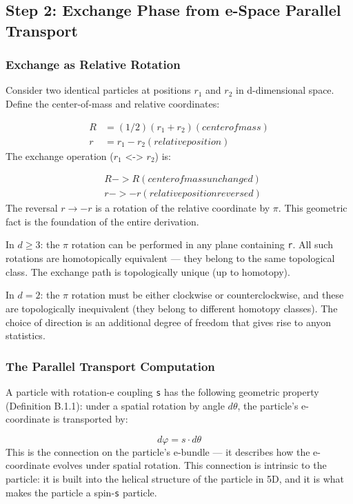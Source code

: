 \documentclass[aps,prd,preprint,superscriptaddress,longbibliography,floatfix]{revtex4-2}
\theoremstyle{remark}
\begin{document}
\subsection{Step 2: Exchange Phase from e-Space Parallel Transport}


\subsubsection{Exchange as Relative Rotation}

Consider two identical particles at positions $r_1$ and $r_2$ in d-dimensional space. Define the center-of-mass and relative coordinates:


\begin{align}
    R &= (1/2)(r_1 + r_2)      (center of mass) \\
    r &= r_1 - r_2              (relative position)
\end{align}
The exchange operation ($r_1$ <-> $r_2$) is:


\begin{align}
    & R -> R      (center of mass unchanged) \\
    & r -> -r     (relative position reversed)
\end{align}
The reversal $r \to -r$ is a rotation of the relative coordinate by $\pi$. This geometric fact is the foundation of the entire derivation.

In $d \geq 3$: the $\pi$ rotation can be performed in any plane containing \texttt{r}. All such rotations are homotopically equivalent --- they belong to the same topological class. The exchange path is topologically unique (up to homotopy).

In $d = 2$: the $\pi$ rotation must be either clockwise or counterclockwise, and these are topologically inequivalent (they belong to different homotopy classes). The choice of direction is an additional degree of freedom that gives rise to anyon statistics.


\subsubsection{The Parallel Transport Computation}

A particle with rotation-e coupling \texttt{s} has the following geometric property (Definition B.1.1): under a spatial rotation by angle $d\theta$, the particle's e-coordinate is transported by:


\begin{equation}
    d\varphi = s \cdot d\theta
\end{equation}
This is the connection on the particle's e-bundle --- it describes how the e-coordinate evolves under spatial rotation. This connection is intrinsic to the particle: it is built into the helical structure of the particle in 5D, and it is what makes the particle a spin-\texttt{s} particle.
\end{document}
